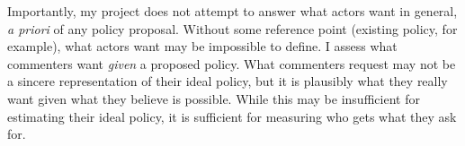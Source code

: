 
Importantly, my project does not attempt to answer what actors want in general, \textit{a priori} of any policy proposal. Without some reference point (existing policy, for example), what actors want may be impossible to define. I assess what commenters want \textit{given} a proposed policy. What commenters request may not be a sincere representation of their ideal policy, but it is plausibly what they really want given what they believe is possible. While this may be insufficient for estimating their ideal policy, it is sufficient for measuring who gets what they ask for. 


